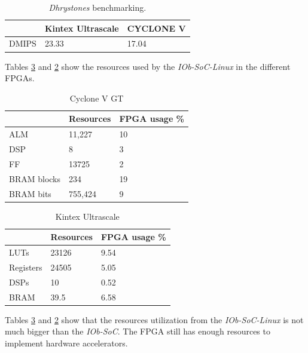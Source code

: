 \begin{table}[!ht]
    \centering
    \begin{tabular}{l|l|l|}
    \cline{2-3}
                                & \textbf{Kintex Ultrascale} & \textbf{CYCLONE V} \\ \hline
    \multicolumn{1}{|l|}{DMIPS} & 23.33                      & 17.04              \\ \hline
    \end{tabular}
    \caption{\textit{Dhrystones} benchmarking.}
    \label{tab:dhrystones}
\end{table}

Tables \ref{tab:kintex_linux} and \ref{tab:cyclone_linux} show the resources used by the \textit{IOb-SoC-Linux} in the different FPGAs.

\begin{table}[!ht]
    \centering
    \begin{tabular}{l|l|l|}
        \cline{2-3}
                                            & Resources & FPGA usage \% \\ \hline
        \multicolumn{1}{|l|}{ALM}         & 11,227    & 10                       \\ \hline
        \multicolumn{1}{|l|}{DSP}         & 8         & 3                        \\ \hline
        \multicolumn{1}{|l|}{FF}          & 13725     & 2                        \\ \hline
        \multicolumn{1}{|l|}{BRAM blocks} & 234       & 19                       \\ \hline
        \multicolumn{1}{|l|}{BRAM bits}   & 755,424   & 9                        \\ \hline
    \end{tabular}
    \caption{Cyclone V GT}
    \label{tab:cyclone_linux}
\end{table}
\begin{table}[!ht]
    \centering
    \begin{tabular}{l|l|l|}
        \cline{2-3}
                                        & Resources & FPGA usage \% \\ \hline
        \multicolumn{1}{|l|}{LUTs}      & 23126     & 9.54                     \\ \hline
        \multicolumn{1}{|l|}{Registers} & 24505     & 5.05                     \\ \hline
        \multicolumn{1}{|l|}{DSPs}      & 10        & 0.52                     \\ \hline
        \multicolumn{1}{|l|}{BRAM}      & 39.5      & 6.58                     \\ \hline
    \end{tabular}
    \caption{Kintex Ultrascale}
    \label{tab:kintex_linux}
\end{table}

Tables \ref{tab:kintex_linux} and \ref{tab:cyclone_linux} show that the resources utilization from the \textit{IOb-SoC-Linux} is not much bigger than the \textit{IOb-SoC}. The FPGA still has enough resources to implement hardware accelerators.
